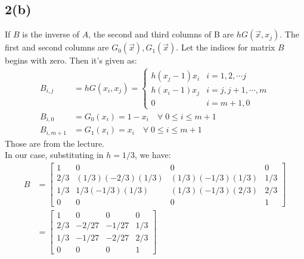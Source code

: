 \documentclass[]{article}
\begin{document}
    \subsection*{2(b)}
        If $B$ is the inverse of $A$, the second and third columns of B are $hG(\vec{x}, x_j)$. The first and second columns are $G_0(\vec{x}), G_1(\vec{x})$. Let the indices for matrix $B$ begins with zero. Then it's given as: 
        \begin{align*}\tag{2.b.1}\label{eqn:2.b.1}
            B_{i, j} &= 
            hG(x_i, x_j) = 
            \begin{cases}
                h(x_j- 1)x_i & i = 1, 2, \cdots j
                \\
                h(x_i - 1)x_j & i = j, j+ 1, \cdots, m
                \\
                0 & i = m + 1, 0
            \end{cases}
            \\
            B_{i, 0} &= G_0(x_i) = 1 - x_i \quad \forall \; 0\le i \le m + 1
            \\
            B_{i, m + 1} &= G_1(x_i) = x_i \quad \forall \;0 \le i \le m + 1
        \end{align*}
        Those are from the lecture.
        \\
        In our case, substituting in $h = 1/3$, we have: 
        \begin{align*}\tag{2.b.2}\label{eqn:2.b.2}
            B&= \begin{bmatrix}
                1 & 0 & 0 & 0 \\
                2/3& (1/3)(-2/3)(1/3) &(1/3)(-1/3)(1/3) & 1/3
                \\
                1/3 & 1/3(-1/3)(1/3) & (1/3)(-1/3)(2/3) & 2/3
                \\
                0 & 0& 0& 1
            \end{bmatrix}
            \\
            &=  
            \begin{bmatrix}
                1 & 0 & 0 & 0 \\
                2/3& -2/27 & -1/27 & 1/3
                \\
                1/3 & -1/27 & -2/27 & 2/3
                \\
                0 & 0& 0& 1
            \end{bmatrix}
        \end{align*}
\end{document}
